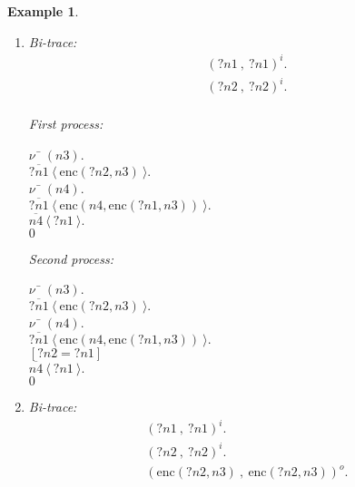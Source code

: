\documentclass{article}
\newenvironment{example}{\begin{exa} \rm}{\end{exa}}
\newtheorem{exa}[theorem]{Example}
\begin{document}
\begin{example}
\begin{enumerate}
First process: 
\begin{tabbing}$0$ \\ 
\end{tabbing}
Second process: 
\begin{tabbing}$0$ \\ 
\end{tabbing}
\item 
Bi-trace: 
$$
\begin{array}{l}
(?n1~ , ~ ?n1)^i. \\ 
(?n2~ , ~ ?n2)^i. \\ 
\end{array}
$$

First process: 
\begin{tabbing}$\nu$ \= $(n3).$ \\ 
$\overline{?n1}~\langle ~\mbox{enc}(?n2,n3) ~ \rangle.$ \\ 
$\nu$ \= $(n4).$ \\ 
$\overline{?n1}~\langle ~\mbox{enc}(n4,\mbox{enc}(?n1,n3)) ~ \rangle.$ \\ 
$\overline{n4}~\langle ~?n1 ~ \rangle.$ \\ 
$0$ \\ 
\end{tabbing}
Second process: 
\begin{tabbing}$\nu$ \= $(n3).$ \\ 
$\overline{?n1}~\langle ~\mbox{enc}(?n2,n3) ~ \rangle.$ \\ 
$\nu$ \= $(n4).$ \\ 
$\overline{?n1}~\langle ~\mbox{enc}(n4,\mbox{enc}(?n1,n3)) ~ \rangle.$ \\ 
${[?n2 = ?n1 ]}$ \\ 
$\overline{n4}~\langle ~?n1 ~ \rangle.$ \\ 
$0$ \\ 
\end{tabbing}
\item 
Bi-trace: 
$$
\begin{array}{l}
(?n1~ , ~ ?n1)^i. \\ 
(?n2~ , ~ ?n2)^i. \\ 
(\mbox{enc}(?n2,n3)~ , ~ \mbox{enc}(?n2,n3))^o. \\ 
\end{array}
$$


\end{enumerate}
\end{example}
\end{document}
